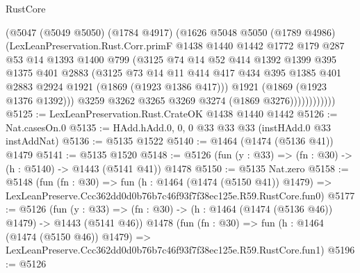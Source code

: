 \begin{lexlean}{RustCore}
\begin{coremodule}
                    (@5047
                      (@5049 @5050)
                      (@1784 @4917)
                      (@1626
                        @5048
                        @5050
                        (@1789 @4986)
                        (LexLeanPreservation.Rust.Corr.primF
                          @1438
                          @1440
                          @1442
                          @1772
                          @179
                          @287
                          @53
                          @14
                          @1393
                          @1400
                          @799
                          (@3125
                            @74
                            @14
                            @52
                            @414
                            @1392
                            @1399
                            @395
                            @1375
                            @401
                            @2883
                            (@3125
                              @73
                              @14
                              @11
                              @414
                              @417
                              @434
                              @395
                              @1385
                              @401
                              @2883
                              @2924
                              @1921
                              (@1869 (@1923 @1386 @417)))
                            @1921
                            (@1869 (@1923 @1376 @1392)))
                          @3259
                          @3262
                          @3265
                          @3269
                          @3274
                          (@1869 @3276))))))))))))
@5125 := LexLeanPreservation.Rust.CrateOK @1438 @1440 @1442
@5126 := Nat.casesOn.{0}
@5135 := HAdd.hAdd.{0, 0, 0} @33 @33 @33 (instHAdd.{0} @33 instAddNat)
@5136 := @5135 @1522
@5140 := @1464 (@1474 (@5136 @41)) @1479
@5141 := @5135 @1520
@5148 := @5126 (fun (y : @33) => (fn : @30) -> (h : @5140) -> @1443 (@5141 @41)) @1478
@5150 := @5135 Nat.zero
@5158 := @5148
    (fun (fn : @30) =>
    fun (h : @1464 (@1474 (@5150 @41)) @1479) =>
    LexLeanPreserve.Ccc362dd0d0b76b7c46f93f7f38ec125e.R59.RustCore.fun0)
@5177 := @5126
    (fun (y : @33) => (fn : @30) -> (h : @1464 (@1474 (@5136 @46)) @1479) -> @1443 (@5141 @46))
    @1478
    (fun (fn : @30) =>
    fun (h : @1464 (@1474 (@5150 @46)) @1479) =>
    LexLeanPreserve.Ccc362dd0d0b76b7c46f93f7f38ec125e.R59.RustCore.fun1)
@5196 := @5126

\end{coremodule}
\end{lexlean}
